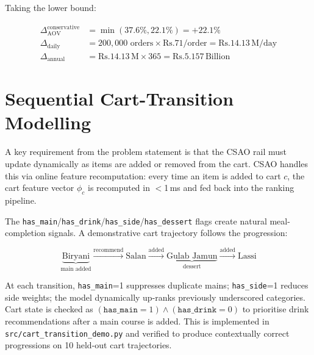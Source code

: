\documentclass[conference]{IEEEtran}
\newcommand{\rupee}{Rs.}
\begin{document}
Taking the lower bound:

\begin{align}
  \Delta_\text{AOV}^\text{conservative} &= \min(37.6\%, 22.1\%) = +22.1\% \\
  \Delta_\text{daily} &= 200{,}000 \text{ orders} \times \text{\rupee}71 / \text{order}
                      = \text{\rupee}14.13\,\text{M/day} \\
  \Delta_\text{annual} &= \text{\rupee}14.13\,\text{M} \times 365
                       = \text{\rupee}5.157\,\text{Billion}
\end{align}


\section{Sequential Cart-Transition Modelling}

A key requirement from the problem statement is that the CSAO rail must update
dynamically as items are added or removed from the cart. CSAO
handles this via online feature recomputation: every time an item is added to
cart $c$, the cart feature vector $\phi_c$ is recomputed in $<$1\,ms and fed
back into the ranking pipeline.

The \texttt{has\_main}/\texttt{has\_drink}/\texttt{has\_side}/\texttt{has\_dessert}
flags create natural meal-completion signals. A demonstrative cart trajectory
follows the progression:

\begin{equation*}
  \underbrace{\text{Biryani}}_{\text{main added}}
  \xrightarrow{\text{recommend}} \text{Salan}
  \xrightarrow{\text{added}} \underbrace{\text{Gulab Jamun}}_{\text{dessert}}
  \xrightarrow{\text{added}} \text{Lassi}
\end{equation*}

At each transition, \texttt{has\_main}=1 suppresses duplicate mains;
\texttt{has\_side}=1 reduces side weights; the model dynamically up-ranks
previously underscored categories. Cart state is checked as
$(\texttt{has\_main} = 1) \wedge (\texttt{has\_drink} = 0)$ to prioritise
drink recommendations after a main course is added. This is implemented in
\texttt{src/cart\_transition\_demo.py} and verified to produce contextually
correct progressions on 10 held-out cart trajectories.


\end{document}
